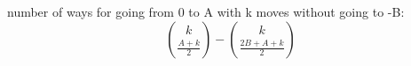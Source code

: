 number of ways for going from 0 to A with k moves without going to -B:
$$ \binom{k}{\frac{A+k}{2}} - \binom{k}{\frac{2B+A+k}{2}} $$
